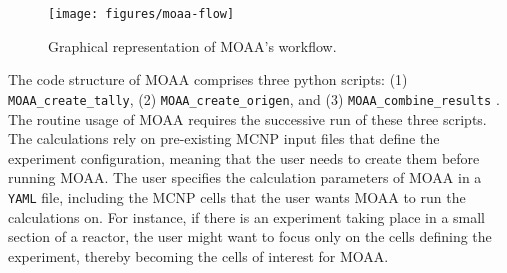 


\begin{figure}[htbp!] %
  \centering
  \texttt{[image: figures/moaa-flow]}
  \caption{Graphical representation of MOAA's workflow.}
  \label{fig:moaa-workflow}
\end{figure}


The code structure of MOAA comprises three python scripts: (1) \texttt{MOAA\_create\_tally}, (2) \texttt{MOAA\_create\_origen}, and (3) \texttt{MOAA\_combine\_results} \cite{fairhurst-agosta_development_2022}.
The routine usage of MOAA requires the successive run of these three scripts.
The calculations rely on pre-existing MCNP input files that define the experiment configuration, meaning that the user needs to create them before running MOAA.
The user specifies the calculation parameters of MOAA in a \texttt{YAML} file, including the MCNP cells that the user wants MOAA to run the calculations on.
For instance, if there is an experiment taking place in a small section of a reactor, the user might want to focus only on the cells defining the experiment, thereby becoming the cells of interest for MOAA.

